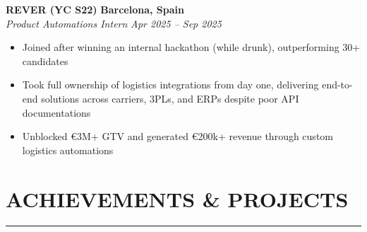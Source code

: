 \documentclass[a4paper,11pt]{article}
\newcommand{\sectionline}{
    \noindent\rule{\textwidth}{0.5pt} %
}
\newcommand{\cvsection}[1]{
    \section{#1} %
    \vspace{-1.0em} %
    \sectionline
}
\newenvironment{cvitemize}
  {\begin{itemize}}
  {\end{itemize}\vspace{0.8em}} %
\begin{document}
\noindent \textbf{REVER (YC S22)} \hfill \textbf{Barcelona, Spain} \\
\textit{Product Automations Intern} \hfill \textit{Apr 2025 -- Sep 2025} \\
\vspace{-0.8em} %
\begin{cvitemize}
    \item Joined after winning an internal hackathon (while drunk), outperforming 30+ candidates
    \item Took full ownership of logistics integrations from day one, delivering end-to-end solutions across carriers, 3PLs, and ERPs despite poor API documentations
    \item Unblocked €3M+ GTV and generated €200k+ revenue through custom logistics automations
\end{cvitemize}

\vspace{0.25em} %






\cvsection{ACHIEVEMENTS \& PROJECTS}
\end{document}
